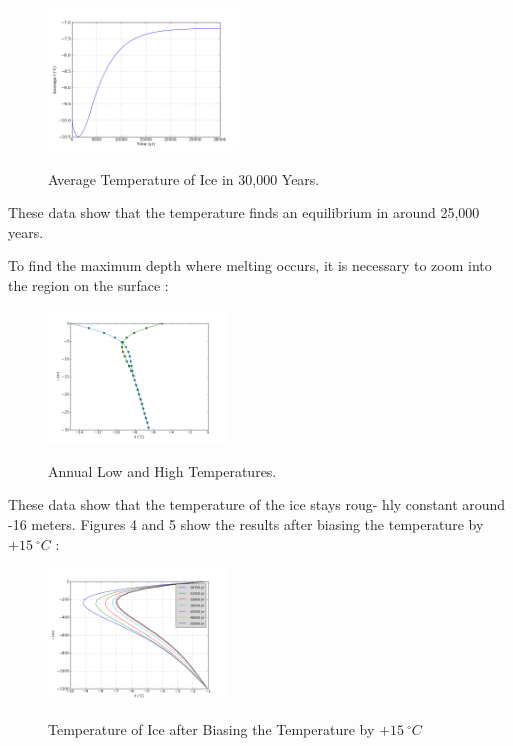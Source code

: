 \documentclass{article}%
\begin{document}
\begin{figure}[H]
	\centering
		\includegraphics[width=0.45\textwidth]{images/30000yr_avg.png}
	\label{fig:500 year orbit}
	\caption{Average Temperature of Ice in 30,000 Years.}
\end{figure}

\noindent These data show that the temperature finds an equilibrium in around 25,000 years.

\newpage

\noindent To find the maximum depth where melting occurs, it is necessary to zoom into the region on the surface :

\begin{figure}[H]
	\centering
		\includegraphics[width=0.42\textwidth]{images/yearHighLow.png}
	\label{fig:500 year orbit}
	\caption{Annual Low and High Temperatures.}
\end{figure}

\noindent These data show that the temperature of the ice stays roug-
hly constant around -16 meters.  Figures 4 and 5 show the results after biasing the temperature by $+15\ ^\circ C$ :

\begin{figure}[H]
	\centering
		\includegraphics[width=0.42\textwidth]{images/60000yr_converge.png}
	\label{fig:500 year orbit}
	\caption{Temperature of Ice after Biasing the Temperature by $+15\ ^\circ C$}
\end{figure}
\end{document}
